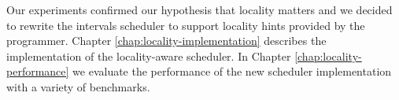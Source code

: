 Our experiments confirmed our hypothesis that locality matters and we
decided to rewrite the intervals scheduler to support locality hints
provided by the programmer. Chapter \ref{chap:locality-implementation}
describes the implementation of the locality-aware scheduler. In
Chapter \ref{chap:locality-performance} we evaluate the performance of
the new scheduler implementation with a variety of benchmarks.


